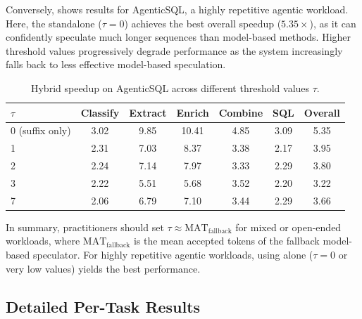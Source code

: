 Conversely,  shows results for AgenticSQL, a highly repetitive agentic workload. Here, the standalone \SuffixDecoding ($\tau = 0$) achieves the best overall speedup ($5.35\times$), as it can confidently speculate much longer sequences than model-based methods. Higher threshold values progressively degrade performance as the system increasingly falls back to less effective model-based speculation.

\begin{table}[htbp]
\centering
\caption{Hybrid \SuffixDecoding speedup on AgenticSQL across different threshold values $\tau$.}
\label{suffixdecoding:tab:threshold-agenticsql}
\small
\begin{tabular}{lcccccc}
\toprule
$\tau$ & Classify & Extract & Enrich & Combine & SQL & Overall \\
\midrule
0 (suffix only) & 3.02 & 9.85 & 10.41 & 4.85 & 3.09 & 5.35 \\
1 & 2.31 & 7.03 & 8.37 & 3.38 & 2.17 & 3.95 \\
2 & 2.24 & 7.14 & 7.97 & 3.33 & 2.29 & 3.80 \\
3 & 2.22 & 5.51 & 5.68 & 3.52 & 2.20 & 3.22 \\
7 & 2.06 & 6.79 & 7.10 & 3.44 & 2.29 & 3.66 \\
\bottomrule
\end{tabular}
\end{table}

In summary, practitioners should set $\tau \approx \text{MAT}_{\text{fallback}}$ for mixed or open-ended workloads, where $\text{MAT}_{\text{fallback}}$ is the mean accepted tokens of the fallback model-based speculator. For highly repetitive agentic workloads, using \SuffixDecoding alone ($\tau = 0$ or very low values) yields the best performance.

\subsection{Detailed Per-Task Results}
\label{suffixdecoding:sec:detailed-results}

